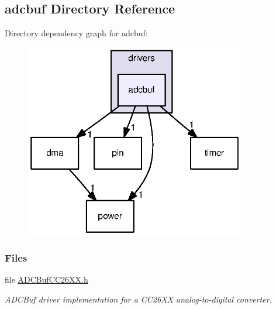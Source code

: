 \subsection{adcbuf Directory Reference}
\label{dir_167c9a72bd38d897d1102afaa614df68}
Directory dependency graph for adcbuf\+:
\nopagebreak
\begin{figure}[H]
\begin{center}
\leavevmode
\includegraphics[width=273pt]{dir_167c9a72bd38d897d1102afaa614df68_dep}
\end{center}
\end{figure}
\subsubsection*{Files}
\begin{DoxyCompactItemize}
\item 
file \hyperlink{_a_d_c_buf_c_c26_x_x_8h}{A\+D\+C\+Buf\+C\+C26\+X\+X.\+h}
\begin{DoxyCompactList}\small\item\em A\+D\+C\+Buf driver implementation for a C\+C26\+X\+X analog-\/to-\/digital converter. \end{DoxyCompactList}\end{DoxyCompactItemize}
